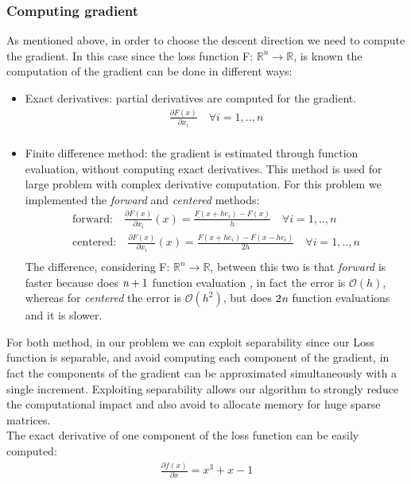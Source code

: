 \documentclass{article}
\begin{document}
\subsubsection{Computing gradient}
As mentioned above, in order to choose the descent direction we need to compute the gradient. In this case since the loss function  F: $\mathbb{R}^{n} \to \mathbb{R}$, is known the computation of the gradient can be done in different ways:\begin{itemize}
    \item Exact derivatives: partial derivatives are computed for the gradient.\begin{gather}
        \frac{\partial F(x)}{\partial x_{i}} \quad \forall i=1,..,n\\
    \end{gather}
    \item Finite difference method: the gradient is estimated through function evaluation, without computing exact derivatives. This method is used for large problem with complex derivative computation. For this problem we implemented the \emph{forward} and \emph{centered} methods: 
    \begin{gather}
       \mbox{forward:} \quad \frac{\partial F(x)}{\partial x_{i}}(x) = \frac{F(x+h{e_{i}}) - F(x)}{h} \quad \forall i=1,..,n\\
        \mbox{centered:} \quad \frac{\partial F(x)}{\partial x_{i}}(x) = \frac{F(x+h{e_{i}}) - F(x-h{e_{i}})}{2h} \quad \forall i=1,..,n\\
    \end{gather}
    The difference, considering F: $\mathbb{R}^{n} \to \mathbb{R}$, between this two is that \emph{forward} is faster because does $\emph{n}+1$ function evaluation , in fact the error is $\mathcal{O}(h)$, whereas for \emph{centered} the error is $\mathcal{O}(h^2)$, but does $2\emph{n}$ function evaluations and it is slower. 
\end{itemize}
For both method, in our problem we can exploit separability since our Loss function is separable, and avoid computing each component of the gradient, in fact the components of the gradient can be approximated simultaneously with a single increment. Exploiting separability allows our algorithm to strongly reduce the computational impact and also avoid to allocate memory for huge sparse matrices.\\
The exact derivative of one component of the loss function can be easily computed: \begin{gather}
    \frac{\partial f(x)}{\partial x} = x^3 + x - 1  
\end{gather}
\end{document}
